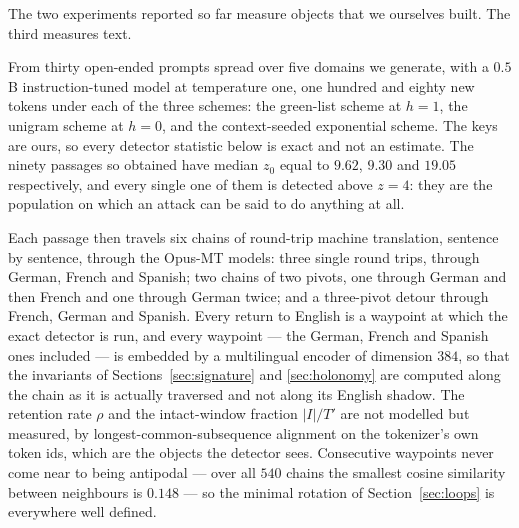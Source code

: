 \documentclass{article}
\theoremstyle{plain}
\theoremstyle{definition}
\numberwithin{equation}{section}
\begin{document}
The two experiments reported so far measure objects that we ourselves
built. The third measures text.

From thirty open-ended prompts spread over five domains we generate,
with a $0.5$B instruction-tuned model at temperature one, one hundred
and eighty new tokens under each of the three schemes: the green-list
scheme at $h=1$, the unigram scheme at $h=0$, and the context-seeded
exponential scheme. The keys are ours, so every detector statistic
below is exact and not an estimate. The ninety passages so obtained
have median $z_0$ equal to $9.62$, $9.30$ and $19.05$ respectively, and
every single one of them is detected above $z = 4$: they are the
population on which an attack can be said to do anything at all.

Each passage then travels six chains of round-trip machine translation,
sentence by sentence, through the Opus-MT models: three single round
trips, through German, French and Spanish; two chains of two pivots,
one through German and then French and one through German twice; and a
three-pivot detour through French, German and Spanish. Every return to
English is a waypoint at which the exact detector is run, and every
waypoint --- the German, French and Spanish ones included --- is
embedded by a multilingual encoder of dimension $384$, so that the
invariants of Sections~\ref{sec:signature} and \ref{sec:holonomy} are
computed along the chain as it is actually traversed and not along its
English shadow. The retention rate $\rho$ and the intact-window
fraction $|I|/T'$ are not modelled but measured, by
longest-common-subsequence alignment on the tokenizer's own token ids,
which are the objects the detector sees. Consecutive waypoints never
come near to being antipodal --- over all $540$ chains the smallest
cosine similarity between neighbours is $0.148$ --- so the minimal
rotation of Section~\ref{sec:loops} is everywhere well defined.
\end{document}
